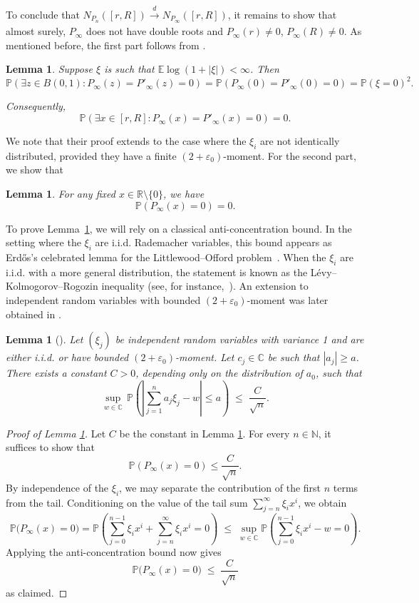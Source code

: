 \documentclass[12pt, reqno]{amsart}
\theoremstyle{plain}
\newtheorem{lemma}[theorem]{Lemma}
\theoremstyle{definition}
\newcommand\C{{\mathbb{C}}}
\newcommand\N{{\mathbb{N}}}
\newcommand\R{{\mathbb{R}}}
\renewcommand\P{{\mathbb{P}}}
\newcommand\E{{\mathbb{E}}}
\newcommand{\ep}{\varepsilon}
\begin{document}
To conclude that $N_{P_{n}}([r, R]) \xrightarrow[]{d} N_{P_{\infty}}([r, R])$, it remains to show that almost surely, $P_\infty$ does not have double roots and $P_{\infty}(r) \neq 0$, $P_{\infty}(R) \neq 0$. 
As mentioned before, the first part follows from  \cite{MichelenYakir2025}.
\begin{lemma}\cite[Theorem 1.3]{MichelenYakir2025}\label{lm:dbr}
	Suppose $\xi$ is such that $\E\log(1 + |\xi|) < \infty$. Then $$\P(\exists z \in B(0, 1): P_{\infty}(z) = P'_{\infty}(z) = 0) = \P(P_{\infty}(0) = P'_{\infty}(0) = 0) = \P(\xi = 0)^2.$$
	
	Consequently, 
	$$\P(\exists x \in [r, R]: P_{\infty}(x) = P'_{\infty}(x) = 0) = 0.$$
\end{lemma}
We note that their proof extends to the case where the $\xi_i$ are not identically distributed, provided they have a finite $(2+\varepsilon_0)$-moment. For the second part, we show that
\begin{lemma}\label{lm:x}
	 For any fixed $x \in \R\setminus \{0\}$, we have
	 $$\P(P_{\infty}(x)=0)=0.$$
\end{lemma}
To prove Lemma~\ref{lm:x}, we will rely on a classical anti-concentration bound. 
In the setting where the $\xi_i$ are i.i.d.  Rademacher variables, this bound appears as 
Erd\H{o}s’s celebrated lemma for the Littlewood--Offord problem~\cite{erdos1945lemma}. 
When the $\xi_i$ are i.i.d.  with a more general distribution, the statement is known as the 
L\'evy--Kolmogorov--Rogozin inequality (see, for instance,~\cite{esseen1968concentration}). 
An extension to independent random variables with bounded 
$(2+\varepsilon_0)$-moment was later obtained in \cite[Lemma~4.1]{DoONguyenVu2018}. 
\begin{lemma}[{\cite[Lemma~4.1]{DoONguyenVu2018}}]\label{lem:ess}
	Let $(\xi_j)$ be independent random variables with variance 1 and are either i.i.d. or have bounded $(2+\ep_0)$-moment.
	Let $c_j \in \mathbb{C}$ 
	be such that $|a_j|\geq a$. 
	There exists a constant $C>0$, depending only on the distribution of $a_0$, such that 
	\[
	\sup_{w \in \mathbb{C}} \, \mathbb{P}\!\left( \left| \sum_{j=1}^{n} a_j \xi_j- w \right| \le a \right) 
	\;\le\; \frac{C}{\sqrt{n}}.
	\]
\end{lemma}

\begin{proof}[Proof of Lemma \ref{lm:x}]
Let $C$ be the constant in Lemma \ref{lem:ess}. For every $n\in \N$, it suffices to show that 
$$\P(P_\infty(x)=0)\le \frac{C}{\sqrt{n}}.$$
By independence of the $\xi_i$, we may separate the contribution of the first $n$ terms from the tail. 
Conditioning on the value of the tail sum $\sum_{j=n}^{\infty} \xi_i x^i$, we obtain
\[
\P\!\big(P_\infty(x)=0\big) 
= \P\!\left(\sum_{j=0}^{n-1} \xi_i x^i +\sum_{j=n}^{\infty} \xi_i x^i=0\right) 
\;\le\; \sup_{w\in \C} \P\!\left(\sum_{j=0}^{n-1} \xi_i x^i - w=0\right).
\]
Applying the anti-concentration bound now gives
\[
\P\!\big(P_\infty(x)=0\big) \;\le\; \frac{C}{\sqrt{n}}
\]
as claimed.
\end{proof}
  
\end{document}
